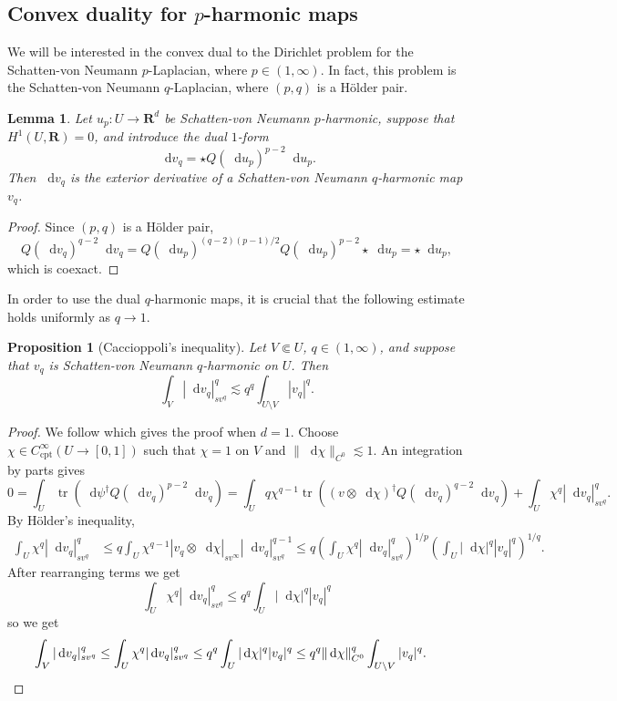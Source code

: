 \documentclass[reqno,11pt]{amsart}
\newcommand{\RR}{\mathbf{R}}
\newcommand*\dif{\mathop{}\!\mathrm{d}}
\DeclareMathOperator{\tr}{tr}
\newcommand{\cpt}{\mathrm{cpt}}
\newtheorem{lemma}[theorem]{Lemma}
\newtheorem{proposition}[theorem]{Proposition}
\theoremstyle{definition}
\numberwithin{equation}{section}
\begin{document}
\subsection{Convex duality for \texorpdfstring{$p$-harmonic}{p-harmonic} maps}
We will be interested in the convex dual to the Dirichlet problem for the Schatten-von Neumann $p$-Laplacian, where $p \in (1, \infty)$.
In fact, this problem is the Schatten-von Neumann $q$-Laplacian, where $(p, q)$ is a H\"older pair.

\begin{lemma}\label{dual maps are harmonic}
Let $u_p: U \to \RR^d$ be Schatten-von Neumann $p$-harmonic, suppose that $H^1(U, \RR) = 0$, and introduce the dual $1$-form
$$\dif v_q = \star Q(\dif u_p)^{p - 2} \dif u_p.$$
Then $\dif v_q$ is the exterior derivative of a Schatten-von Neumann $q$-harmonic map $v_q$.
\end{lemma}
\begin{proof}
Since $(p, q)$ is a H\"older pair,
$$Q(\dif v_q)^{q - 2} \dif v_q = Q(\dif u_p)^{(q - 2)(p - 1)/2} Q(\dif u_p)^{p - 2} \star \dif u_p = \star \dif u_p,$$
which is coexact.
\end{proof}

In order to use the dual $q$-harmonic maps, it is crucial that the following estimate holds uniformly as $q \to 1$.

\begin{proposition}[Caccioppoli's inequality]
Let $V \Subset U$, $q \in (1, \infty)$, and suppose that $v_q$ is Schatten-von Neumann $q$-harmonic on $U$.
Then
$$\int_V |\dif v_q|_{sv^q}^q \lesssim q^q \int_{U \setminus V} |v_q|^q.$$
\end{proposition}
\begin{proof}
We follow \cite[Theorem 11.20]{kinnunen2021maximal} which gives the proof when $d = 1$.
Choose $\chi \in C^\infty_\cpt(U \to [0, 1])$ such that $\chi = 1$ on $V$ and $\|\dif \chi\|_{C^0} \lesssim 1$.
An integration by parts gives
$$0 = \int_U \tr(\dif \psi^\dagger Q(\dif v_q)^{p - 2} \dif v_q) = \int_U q\chi^{q - 1} \tr((v \otimes \dif \chi)^\dagger Q(\dif v_q)^{q - 2} \dif v_q) + \int_U \chi^q |\dif v_q|_{sv^q}^q.$$
By H\"older's inequality,
\begin{align*}
\int_U \chi^q |\dif v_q|_{sv^q}^q 
&\leq q \int_U \chi^{q - 1} |v_q \otimes \dif \chi|_{sv^\infty} |\dif v_q|_{sv^q}^{q - 1}
\leq q \left(\int_U \chi^q |\dif v_q|_{sv^q}^q\right)^{1/p} \left(\int_U |\dif \chi|^q |v_q|^q\right)^{1/q}.
\end{align*}
After rearranging terms we get 
$$\int_U \chi^q |\dif v_q|_{sv^q}^q \leq q^q \int_U |\dif \chi|^q |v_q|^q$$
so we get 
\begin{align*}
\int_V |\dif v_q|_{sv^q}^q &\leq \int_U \chi^q |\dif v_q|_{sv^q}^q \leq q^q \int_U |\dif \chi|^q |v_q|^q
\leq q^q \|\dif \chi\|_{C^0}^q \int_{U \setminus V} |v_q|^q. \qedhere 
\end{align*}
\end{proof}
\end{document}
